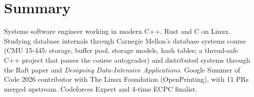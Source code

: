 \documentclass[10pt]{article}
\begin{document}

\section*{Summary}
Systems software engineer working in modern C++, Rust and C on Linux. Studying database internals through Carnegie Mellon's database systems course (CMU 15-445: storage, buffer pool, storage models, hash tables; a thread-safe C++ project that passes the course autograder) and distributed systems through the Raft paper and \emph{Designing Data-Intensive Applications}. Google Summer of Code 2026 contributor with The Linux Foundation (OpenPrinting), with 11 PRs merged upstream. Codeforces Expert and 4-time ECPC finalist.
\end{document}

